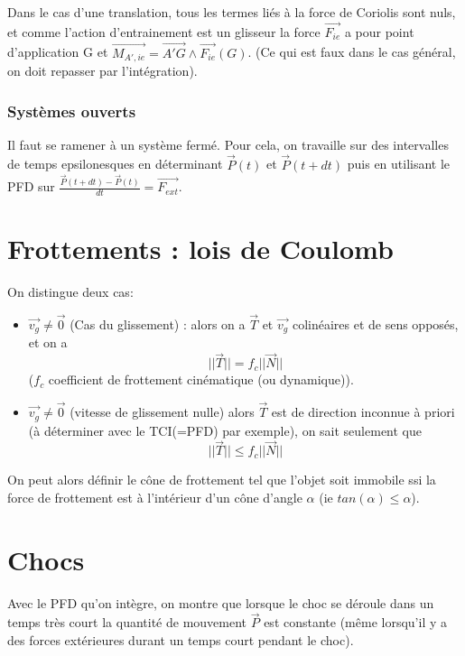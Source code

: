 \documentclass[9pt]{article}
\begin{document}
\begin{multicols*}{2}
Dans le cas d'une translation, tous les termes liés à la force de Coriolis sont nuls, et comme l'action d'entrainement est un glisseur la force $\overrightarrow{F_{ie}}$ a pour point d'application G et $\overrightarrow{M_{A',ie}} = \overrightarrow{A'G}\wedge\overrightarrow{F_{ie}}(G)$. (Ce qui est faux dans le cas général, on doit repasser par l'intégration).

\section{Systèmes ouverts}
Il faut se ramener à un système fermé. Pour cela, on travaille sur des intervalles de temps epsilonesques en déterminant $\overrightarrow{P}(t)$ et $\overrightarrow{P}(t+dt)$ puis en utilisant le PFD sur $\frac{\overrightarrow{P}(t+dt) - \overrightarrow{P}(t)}{dt} = \overrightarrow{F_{ext}}$.

\part{Frottements : lois de Coulomb}
On distingue deux cas:
\begin{itemize}

\item $\overrightarrow{v_g} \neq \overrightarrow{0}$ (Cas du glissement) : alors on a $\overrightarrow{T}$ et $\overrightarrow{v_g}$ colinéaires et de sens opposés, et on a
$$\boxed{||\overrightarrow{T}|| = f_c||\overrightarrow{N}||}$$ ($f_c$ coefficient de frottement cinématique (ou dynamique)). \\

\item $\overrightarrow{v_g} \neq \overrightarrow{0}$ (vitesse de glissement nulle) alors $\overrightarrow{T}$ est de direction inconnue à priori (à déterminer avec le TCI(=PFD) par exemple), on sait seulement que $$\boxed{||\overrightarrow{T}|| \leq f_c||\overrightarrow{N}||}$$

\end{itemize}

On peut alors définir le cône de frottement tel que l'objet soit immobile ssi la force de frottement est à l'intérieur d'un cône d'angle $\alpha$ (ie $tan(\alpha) \leq \alpha$).

\part{Chocs}
Avec le PFD qu'on intègre, on montre que lorsque le choc se déroule dans un temps très court la quantité de mouvement $\overrightarrow{P}$ est constante (même lorsqu'il y a des forces extérieures durant un temps court pendant le choc).\\


\end{multicols*}
\end{document}

